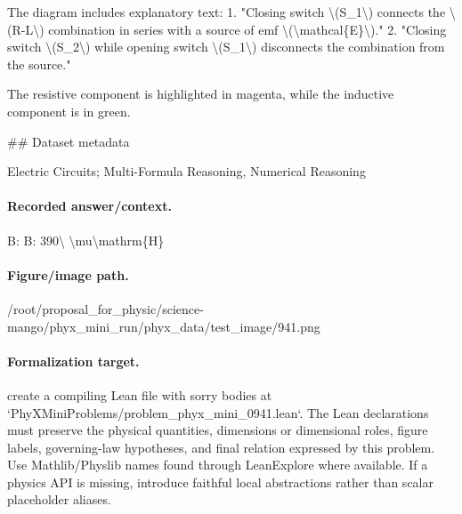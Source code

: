The diagram includes explanatory text: 
1. "Closing switch \textbackslash{}(S\_1\textbackslash{}) connects the \textbackslash{}(R-L\textbackslash{}) combination in series with a source of emf \textbackslash{}(\textbackslash{}mathcal\{E\}\textbackslash{})."
2. "Closing switch \textbackslash{}(S\_2\textbackslash{}) while opening switch \textbackslash{}(S\_1\textbackslash{}) disconnects the combination from the source."

The resistive component is highlighted in magenta, while the inductive component is in green.

\#\# Dataset metadata

Electric Circuits; Multi-Formula Reasoning, Numerical Reasoning

\paragraph{Recorded answer/context.}
B: B: 390\textbackslash{} \textbackslash{}mu\textbackslash{}mathrm\{H\}

\paragraph{Figure/image path.}
/root/proposal\_for\_physic/science-mango/phyx\_mini\_run/phyx\_data/test\_image/941.png

\paragraph{Formalization target.}
create a compiling Lean file with sorry bodies at `PhyXMiniProblems/problem\_phyx\_mini\_0941.lean`. The Lean declarations must preserve the physical quantities, dimensions or dimensional roles, figure labels, governing-law hypotheses, and final relation expressed by this problem.
Use Mathlib/Physlib names found through LeanExplore where available. If a physics API is missing, introduce faithful local abstractions rather than scalar placeholder aliases.

